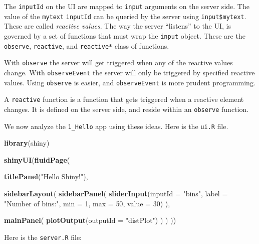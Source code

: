 \documentclass[]{book}
\newenvironment{Shaded}{\begin{snugshade}}{\end{snugshade}}
\newcommand{\KeywordTok}[1]{\textcolor[rgb]{0.13,0.29,0.53}{\textbf{#1}}}
\newcommand{\DataTypeTok}[1]{\textcolor[rgb]{0.13,0.29,0.53}{#1}}
\newcommand{\DecValTok}[1]{\textcolor[rgb]{0.00,0.00,0.81}{#1}}
\newcommand{\StringTok}[1]{\textcolor[rgb]{0.31,0.60,0.02}{#1}}
\newcommand{\NormalTok}[1]{#1}
\theoremstyle{definition}
\theoremstyle{definition}
\theoremstyle{definition}
\theoremstyle{remark}
\begin{document}
The \texttt{inputId} on the UI are mapped to \texttt{input} arguments on
the server side. The value of the \texttt{mytext} \texttt{inputId} can
be queried by the server using \texttt{input\$mytext}. These are called
\emph{reactive values}. The way the server ``listens'' to the UI, is
governed by a set of functions that must wrap the \texttt{input} object.
These are the \texttt{observe}, \texttt{reactive}, and
\texttt{reactive*} class of functions.

With \texttt{observe} the server will get triggered when any of the
reactive values change. With \texttt{observeEvent} the server will only
be triggered by specified reactive values. Using \texttt{observe} is
easier, and \texttt{observeEvent} is more prudent programming.

A \texttt{reactive} function is a function that gets triggered when a
reactive element changes. It is defined on the server side, and reside
within an \texttt{observe} function.

We now analyze the \texttt{1\_Hello} app using these ideas. Here is the
\texttt{ui.R} file.

\begin{Shaded}
\begin{Highlighting}[]
\KeywordTok{library}\NormalTok{(shiny)}

\KeywordTok{shinyUI}\NormalTok{(}\KeywordTok{fluidPage}\NormalTok{(}

  \KeywordTok{titlePanel}\NormalTok{(}\StringTok{"Hello Shiny!"}\NormalTok{),}

  \KeywordTok{sidebarLayout}\NormalTok{(}
    \KeywordTok{sidebarPanel}\NormalTok{(}
      \KeywordTok{sliderInput}\NormalTok{(}\DataTypeTok{inputId =} \StringTok{"bins"}\NormalTok{,}
                  \DataTypeTok{label =} \StringTok{"Number of bins:"}\NormalTok{, }
                  \DataTypeTok{min =} \DecValTok{1}\NormalTok{,}
                  \DataTypeTok{max =} \DecValTok{50}\NormalTok{,}
                  \DataTypeTok{value =} \DecValTok{30}\NormalTok{)}
\NormalTok{    ),}

    \KeywordTok{mainPanel}\NormalTok{(}
      \KeywordTok{plotOutput}\NormalTok{(}\DataTypeTok{outputId =} \StringTok{"distPlot"}\NormalTok{)}
\NormalTok{    )}
\NormalTok{  )}
\NormalTok{))}
\end{Highlighting}
\end{Shaded}

Here is the \texttt{server.R} file:
\end{document}
